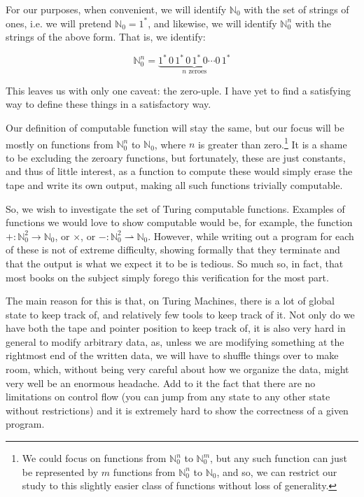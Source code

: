 \documentclass{article}
\newcommand{\N}{\mathbb{N}}
\begin{document}
	For our purposes, when convenient, we will identify $\N_0$ with the set of strings of ones, i.e. we will pretend $\N_0 = 1^*$, and likewise, we will identify $\N_0^n$ with the strings of the above form. That is, we identify:
	
	\[\N_0^n = \underbrace{1^*\,0\,1^*\,0\,1^*\,0 \cdots 0\,1^*}_{n \text{ zeroes}}\]
	
	This leaves us with only one caveat: the zero-uple. I have yet to find a satisfying way to define these things in a satisfactory way.
	
	Our definition of computable function will stay the same, but our focus will be mostly on functions from $\N_0^n$ to $\N_0$, where $n$ is greater than zero.\footnote{We could focus on functions from $\N_0^n$ to $\N_0^m$, but any such function can just be represented by $m$ functions from $\N_0^n$ to $\N_0$, and so, we can restrict our study to this slightly easier class of functions without loss of generality.} It is a shame to be excluding the zeroary functions, but fortunately, these are just constants, and thus of little interest, as a function to compute these would simply erase the tape and write its own output, making all such functions trivially computable.
	
	So, we wish to investigate the set of Turing computable functions. Examples of functions we would love to show computable would be, for example, the function $+ : \N_0^2 \rightarrow \N_0$, or $\times$, or $- : \N_0^2 \rightharpoonup \N_0$. However, while writing out a program for each of these is not of extreme difficulty, showing formally that they terminate and that the output is what we expect it to be is tedious. So much so, in fact, that most books on the subject simply forego this verification for the most part.
	
	The main reason for this is that, on Turing Machines, there is a lot of global state to keep track of, and relatively few tools to keep track of it. Not only do we have both the tape and pointer position to keep track of, it is also very hard in general to modify arbitrary data, as, unless we are modifying something at the rightmost end of the written data, we will have to shuffle things over to make room, which, without being very careful about how we organize the data, might very well be an enormous headache. Add to it the fact that there are no limitations on control flow (you can jump from any state to any other state without restrictions) and it is extremely hard to show the correctness of a given program.
	
\end{document}
